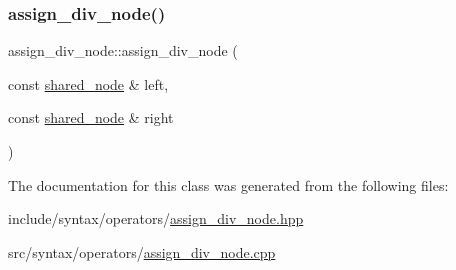 \subsubsection{\texorpdfstring{assign\+\_\+div\+\_\+node()}{assign\_div\_node()}}
{\footnotesize\ttfamily assign\+\_\+div\+\_\+node\+::assign\+\_\+div\+\_\+node (\begin{DoxyParamCaption}\item[{const \hyperlink{namespacejawe_a3f307481d921b6cbb50cc8511fc2b544}{shared\+\_\+node} \&}]{left,  }\item[{const \hyperlink{namespacejawe_a3f307481d921b6cbb50cc8511fc2b544}{shared\+\_\+node} \&}]{right }\end{DoxyParamCaption})}



The documentation for this class was generated from the following files\+:\begin{DoxyCompactItemize}
\item 
include/syntax/operators/\hyperlink{assign__div__node_8hpp}{assign\+\_\+div\+\_\+node.\+hpp}\item 
src/syntax/operators/\hyperlink{assign__div__node_8cpp}{assign\+\_\+div\+\_\+node.\+cpp}\end{DoxyCompactItemize}
